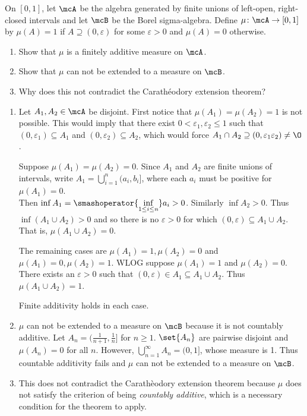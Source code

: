 \documentclass[12pt]{article}
\begin{document}
\begin{problem}
    On $[0, 1]$, let $\mcA$ be the algebra generated by finite unions of
    left-open, right-closed intervals and let $\mcB$ be the Borel
    sigma-algebra.
    Define $\mu\colon \mcA \to [0, 1]$ by $\mu(A) = 1$ if
    $A \supseteq (0, \varepsilon)$ for some $\varepsilon > 0$ and
    $\mu(A) = 0$ otherwise.
    \begin{enumerate}[(1)]
        \item Show that $\mu$ is a finitely additive measure on $\mcA$.
        \item Show that $\mu$ can not be extended to a measure on $\mcB$.
        \item Why does this not contradict the Carath\'eodory extension
            theorem?
    \end{enumerate}
\end{problem}
\begin{solution} \leavevmode
  \begin{enumerate}[(1)]
    \item Let $A_1, A_2 \in \mcA$ be disjoint.
    First notice that $\mu(A_1) = \mu(A_2) = 1$ is not possible.
    This would imply that there exist
    $0 < \varepsilon_1, \varepsilon_2 \le 1$ such that
    $(0, \varepsilon_1) \subseteq A_1$ and
    $(0, \varepsilon_2) \subseteq A_2$, which would force
    $A_1 \cap A_2 \supseteq (0, \varepsilon_1 \varepsilon_2) \ne \O$.

    Suppose $\mu(A_1) = \mu(A_2) = 0$.
    Since $A_1$ and $A_2$ are finite unions of intervals,
    write $A_1 = \bigcup_{i=1}^n (a_i, b_i]$, where each $a_i$ must be
    positive for $\mu(A_1) = 0$. \\
    Then $\inf A_1 = \smashoperator{\inf\limits_{1 \le i \le n}} a_i > 0$.
    Similarly $\inf A_2 > 0$.
    Thus $\inf (A_1 \cup A_2) > 0$ and so there is no $\varepsilon > 0$
    for which $(0, \varepsilon) \subseteq A_1 \cup A_2$.
    That is, $\mu(A_1 \cup A_2) = 0$.

    The remaining cases are $\mu(A_1) = 1, \mu(A_2) = 0$ and
    $\mu(A_1) = 0, \mu(A_2) = 1$.
    WLOG suppose $\mu(A_1) = 1$ and $\mu(A_2) = 0$.
    There exists an $\varepsilon > 0$ such that
    $(0, \varepsilon) \in A_1 \subseteq A_1 \cup A_2$.
    Thus $\mu(A_1 \cup A_2) = 1$.

    Finite additivity holds in each case.

    \item $\mu$ can not be extended to a measure on $\mcB$ because
    it is not countably additive.
    Let $A_n = (\frac1{n+1}, \frac1n]$ for $n \ge 1$.
    $\set{A_n}$ are pairwise disjoint and $\mu(A_n) = 0$ for all $n$.
    However, $\bigcup_{n=1}^\infty A_n = (0, 1]$, whose measure is 1.
    Thus countable additivity fails and $\mu$ can not be extended to
    a measure on $\mcB$.

    \item This does not contradict the Carath\`eodory extension theorem
    because $\mu$ does not satisfy the criterion of being \emph{countably
    additive}, which is a necessary condition for the theorem to apply.
    \qedhere
  \end{enumerate}
\end{solution}
\end{document}
